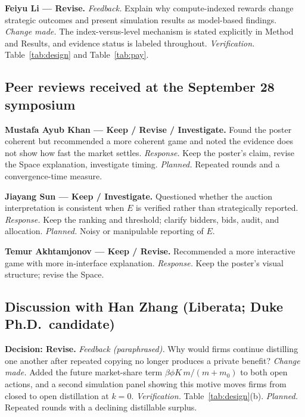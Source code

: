 \noindent\textbf{Feiyu Li --- Revise.} \emph{Feedback.} Explain why compute-indexed rewards change strategic outcomes and present simulation results as model-based findings. \emph{Change made.} The index-versus-level mechanism is stated explicitly in Method and Results, and evidence status is labeled throughout. \emph{Verification.} Table~\ref{tab:design} and Table~\ref{tab:pay}.

\subsection{Peer reviews received at the September 28 symposium}
\noindent\textbf{Mustafa Ayub Khan --- Keep / Revise / Investigate.} Found the poster coherent but recommended a more coherent game and noted the evidence does not show how fast the market settles. \emph{Response.} Keep the poster's claim, revise the Space explanation, investigate timing. \emph{Planned.} Repeated rounds and a convergence-time measure.

\noindent\textbf{Jiayang Sun --- Keep / Investigate.} Questioned whether the auction interpretation is consistent when $E$ is verified rather than strategically reported. \emph{Response.} Keep the ranking and threshold; clarify bidders, bids, audit, and allocation. \emph{Planned.} Noisy or manipulable reporting of $E$.

\noindent\textbf{Temur Akhtamjonov --- Keep / Revise.} Recommended a more interactive game with more in-interface explanation. \emph{Response.} Keep the poster's visual structure; revise the Space.

\subsection{Discussion with Han Zhang (Liberata; Duke Ph.D.\ candidate)}
\noindent\textbf{Decision: Revise.} \emph{Feedback (paraphrased).} Why would firms continue distilling one another after repeated copying no longer produces a private benefit? \emph{Change made.} Added the future market-share term $\beta\phi K\,m/(m+m_0)$ to both open actions, and a second simulation panel showing this motive moves firms from closed to open distillation at $k=0$. \emph{Verification.} Table~\ref{tab:design}(b). \emph{Planned.} Repeated rounds with a declining distillable surplus.

\clearpage\nobalance\onecolumn
